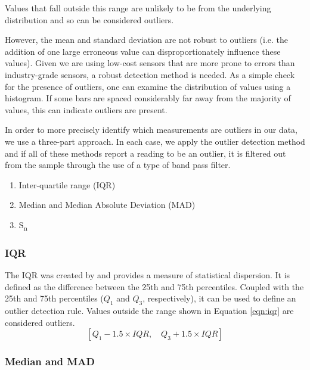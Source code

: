 \documentclass[11pt]{report}
\begin{document}
Values that fall outside this range are unlikely to be from the underlying distribution and so can be considered outliers.

However, the mean and standard deviation are not robust to outliers (i.e. the addition of one large erroneous value can disproportionately influence these values). Given we are using low-cost sensors that are more prone to errors than industry-grade sensors, a robust detection method is needed. As a simple check for the presence of outliers, one can examine the distribution of values using a histogram. If some bars are spaced considerably far away from the majority of values, this can indicate outliers are present.

In order to more precisely identify which measurements are outliers in our data, we use a three-part approach. In each case, we apply the outlier detection method and if all of these methods report a reading to be an outlier, it is filtered out from the sample through the use of a type of band pass filter.
\begin{enumerate}
\item Inter-quartile range (IQR)
\item Median and Median Absolute Deviation (MAD)
\item S\textsubscript{n}
\end{enumerate}


\subsubsection{IQR} \label{iqr}

The IQR was created by \cite{tukey1977iqr} and provides a measure of statistical dispersion. It is defined as the difference between the 25th and 75th percentiles. Coupled with the 25th and 75th percentiles ($Q_1$ and $Q_3$, respectively), it can be used to define an outlier detection rule. Values outside the range shown in Equation \ref{eqn:iqr} are considered outliers.
\begin{equation} \label{eqn:iqr}
[ Q_1 - 1.5 \times IQR, \quad Q_3 + 1.5 \times IQR]
\end{equation}

\subsubsection{Median and MAD} \label{mad}
\end{document}
